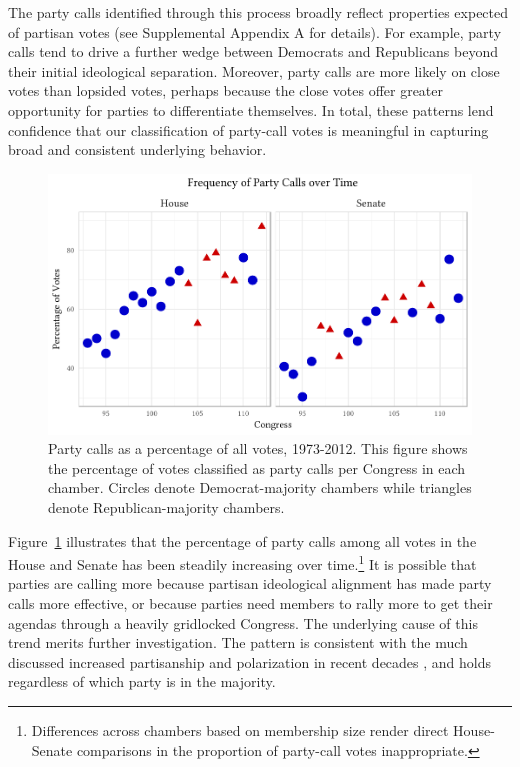 \documentclass[12pt]{article}
\begin{document}
The party calls identified through this process broadly reflect properties
expected of partisan votes (see Supplemental Appendix A for details).
For example, party calls tend to drive a further wedge between Democrats and
Republicans beyond their initial ideological separation.
Moreover, party calls are more likely on close votes than lopsided votes,
perhaps because the close votes offer greater opportunity for parties to
differentiate themselves.
In total, these patterns lend confidence that our classification of party-call
votes is meaningful in capturing broad and consistent underlying behavior.

\begin{figure}[t]
\centering
\includegraphics{party-calls-over-time.pdf}
\caption{
  Party calls as a percentage of all votes, 1973-2012.
  This figure shows the percentage of votes classified as party calls per
  Congress in each chamber.
  Circles denote Democrat-majority chambers while triangles denote
  Republican-majority chambers.
  \label{fig-party-calls-over-time}}
\end{figure}

Figure~\ref{fig-party-calls-over-time} illustrates that the percentage of party
calls among all votes in the House and Senate has been steadily increasing over
time.\footnote{
  \doublespacing\normalsize
  Differences across chambers based on membership size render
  direct House-Senate comparisons in the proportion of party-call votes
  inappropriate.}
It is possible that parties are calling more because partisan ideological
alignment has made party calls more effective, or because parties need members
to rally more to get their agendas through a heavily gridlocked Congress.
The underlying cause of this trend merits further investigation.
The pattern is consistent with the much discussed increased partisanship and
polarization in recent decades \citep[e.g.,][]{Aldrich:2000, Lee:2009, Lee:2016,
Theriault:2013, Smith:2014}, and holds regardless of which party is in the
majority.
\end{document}
